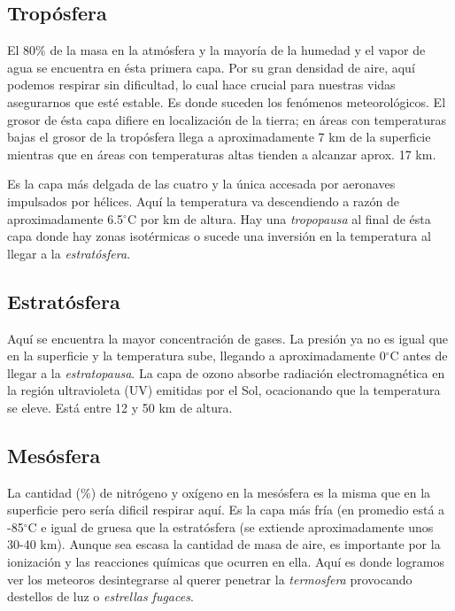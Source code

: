 \documentclass[12pt]{article}
\begin{document}
\subsection{Trop\'osfera}

\noindent

El 80$\%$ de la masa en la atm\'osfera y la mayor\'ia de la humedad y el vapor de agua se encuentra en \'esta primera capa. Por su gran densidad de aire, aqu\'i podemos respirar sin dificultad, lo cual hace crucial para nuestras vidas asegurarnos que esté estable. Es donde suceden los fen\'omenos meteorol\'ogicos. El grosor de \'esta capa difiere en localizaci\'on de la tierra; en \'areas con temperaturas bajas el grosor de la trop\'osfera llega a aproximadamente 7 km de la superficie mientras que en \'areas con temperaturas altas tienden a alcanzar aprox. 17 km. 

Es la capa m\'as delgada de las cuatro y la \'unica accesada por aeronaves impulsados por h\'elices. Aqu\'i la temperatura va descendiendo a raz\'on de aproximadamente 6.5$^{\circ}$C por km de altura. Hay una \emph{tropopausa} al final de \'esta capa donde hay zonas isot\'ermicas o sucede una inversi\'on en la temperatura al llegar a la \emph{estrat\'osfera}.

\subsection{Estrat\'osfera}
\noindent

Aqu\'i se encuentra la mayor concentraci\'on de gases. La presi\'on ya no es igual que en la superficie y la temperatura sube, llegando a aproximadamente 0$^{\circ}$C antes de llegar a la \emph{estratopausa}. La capa de ozono absorbe radiaci\'on electromagn\'etica en la regi\'on ultravioleta (UV) emitidas por el Sol, ocacionando que la temperatura se eleve. Est\'a entre 12 y 50 km de altura. 

\subsection{Mes\'osfera}
\noindent

La cantidad ($\%$) de nitr\'ogeno y ox\'igeno en la mes\'osfera es la misma que en la superficie pero ser\'ia dificil respirar aqu\'i. Es la capa m\'as fr\'ia (en promedio est\'a a -85$^{\circ}$C e igual de gruesa que la estrat\'osfera (se extiende aproximadamente unos 30-40 km). Aunque sea escasa la cantidad de masa de aire, es importante por la ionización y las reacciones químicas que ocurren en ella. Aqu\'i es donde logramos ver los meteoros desintegrarse al querer penetrar la \emph{termosfera} provocando destellos de luz o \emph{estrellas fugaces}.
\end{document}
